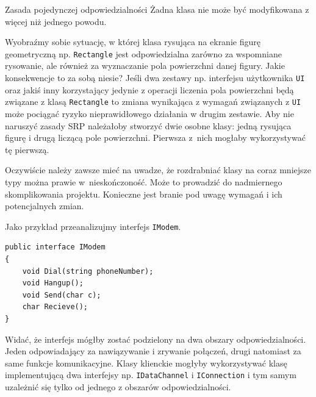 \begin{myboxWithTitle}{Zasada pojedynczej odpowiedzialności}
	Żadna klasa nie może być modyfikowana z więcej niż jednego powodu.
\end{myboxWithTitle}

Wyobraźmy sobie sytuację, w której klasa rysująca na ekranie figurę geometryczną np. \texttt{Rectangle} jest odpowiedzialna zarówno za wspomniane rysowanie, ale również za wyznaczanie pola powierzchni danej figury. Jakie konsekwencje to za sobą niesie? Jeśli dwa zestawy np. interfejsu użytkownika \texttt{UI} oraz jakiś inny korzystający jedynie z operacji liczenia pola powierzchni będą związane z klasą \texttt{Rectangle} to zmiana wynikająca z wymagań związanych z \texttt{UI} może pociągać ryzyko nieprawidłowego działania w drugim zestawie. Aby nie naruszyć zasady SRP należałoby stworzyć dwie osobne klasy: jedną rysująca figurę i drugą liczącą pole powierzchni. Pierwsza z~nich mogłaby wykorzystywać tę pierwszą. 

Oczywiście należy zawsze mieć na uwadze, że rozdrabniać klasy na coraz mniejsze typy można prawie w~nieskończoność. Może to prowadzić do nadmiernego skomplikowania projektu. Konieczne jest branie pod uwagę wymagań i ich potencjalnych zmian.

Jako przykład przeanalizujmy interfejs \texttt{IModem}.
\begin{lstlisting}[caption={Naruszenie zasady SRP}, label={lab1/lst/srpViolationModem}]
public interface IModem
{
	void Dial(string phoneNumber);
	void Hangup();
	void Send(char c);
	char Recieve();
}
\end{lstlisting}
Widać, że interfejs mógłby zostać podzielony na dwa obszary odpowiedzialności. Jeden odpowiadający za nawiązywanie i zrywanie połączeń, drugi natomiast za same funkcje komunikacyjne. Klasy klienckie mogłyby wykorzystywać klasę implementującą dwa interfejsy np. \texttt{IDataChannel} i \texttt{IConnection} i tym samym uzależnić się tylko od jednego z obszarów odpowiedzialności. 

%

